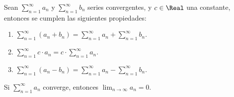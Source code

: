 \begin{frame}
  \begin{prop}
    Sean $\sum_{n=1}^{\infty}a_n$ y $\sum_{n=1}^{\infty}b_n$ series convergentes, y $c\in\Real$ una constante, entonces se cumplen las siguientes propiedades:\\[0.5cm]
    \begin{enumerate}
      \item<2-> $\sum_{n=1}^{\infty}(a_n+b_n)=\sum_{n=1}^{\infty}a_n+\sum_{n=1}^{\infty}b_n$.\\[0.25cm]
      \item<3-> $\sum_{n=1}^{\infty}c\cdot a_n=c\cdot\sum_{n=1}^{\infty}a_n$.\\[0.25cm]
      \item<4-> $\sum_{n=1}^{\infty}(a_n-b_n)=\sum_{n=1}^{\infty}a_n-\sum_{n=1}^{\infty}b_n$.\\[0.25cm]
    \end{enumerate}
  \end{prop}
\end{frame}

\begin{frame}
  \begin{thm}
    Si $\sum_{n=1}^{\infty}a_n$ converge, entonces $\lim_{n\to\infty}a_n=0$.
  \end{thm}
\end{frame}


